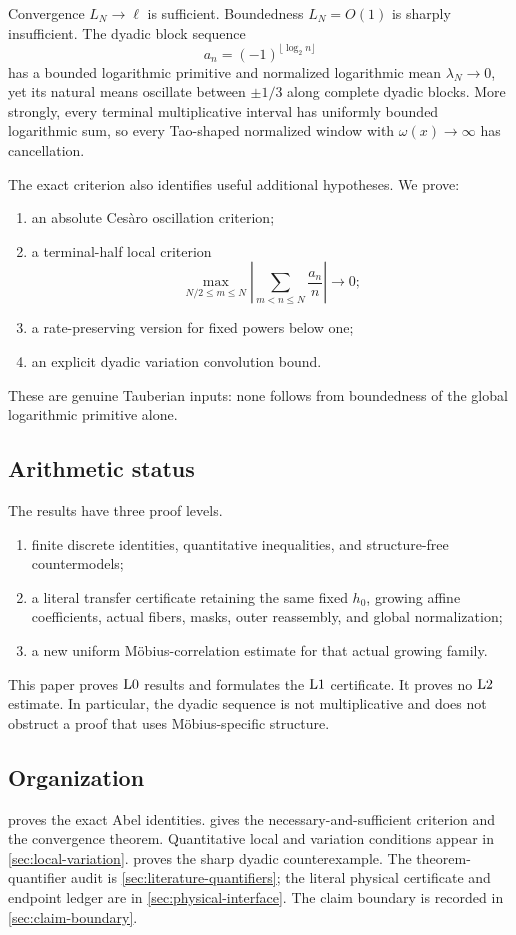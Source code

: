 Convergence \(L_N\to\ell\) is sufficient.  Boundedness \(L_N=O(1)\)
is sharply insufficient.  The dyadic block sequence
\[
 a_n=(-1)^{\lfloor\log_2n\rfloor}
\]
has a bounded logarithmic primitive and normalized logarithmic mean
\(\lambda_N\to0\), yet its natural means oscillate between
\(\pm1/3\) along complete dyadic blocks.  More strongly, every
terminal multiplicative interval has uniformly bounded logarithmic
sum, so every Tao-shaped normalized window with
\(\omega(x)\to\infty\) has cancellation.

The exact criterion also identifies useful additional hypotheses.
We prove:
\begin{enumerate}[label=\textup{(\roman*)},leftmargin=2.5em]
 \item an absolute Ces\`aro oscillation criterion;
 \item a terminal-half local criterion
 \[
  \max_{N/2\le m\le N}
  \left|\sum_{m<n\le N}\frac{a_n}{n}\right|\to0;
 \]
 \item a rate-preserving version for fixed powers below one;
 \item an explicit dyadic variation convolution bound.
\end{enumerate}
These are genuine Tauberian inputs: none follows from boundedness of
the global logarithmic primitive alone.

\subsection{Arithmetic status}

The results have three proof levels.
\begin{enumerate}[label=\textup{\(\mathrm{L}\arabic*\):},leftmargin=3.2em,start=0]
 \item finite discrete identities, quantitative inequalities, and
 structure-free countermodels;
 \item a literal transfer certificate retaining the same fixed
 \(h_0\), growing affine coefficients, actual fibers, masks, outer
 reassembly, and global normalization;
 \item a new uniform M\"obius-correlation estimate for that actual
 growing family.
\end{enumerate}
This paper proves \(\mathrm{L0}\) results and formulates the \(\mathrm{L1}\)
certificate.  It proves no \(\mathrm{L2}\) estimate.  In particular, the
dyadic sequence is not multiplicative and does not obstruct a proof
that uses M\"obius-specific structure.

\subsection{Organization}

 proves the exact Abel identities.
 gives the necessary-and-sufficient
criterion and the convergence theorem.  Quantitative local and
variation conditions appear in \cref{sec:local-variation}.
 proves the sharp dyadic
counterexample.  The theorem-quantifier audit is
\cref{sec:literature-quantifiers}; the literal physical certificate
and endpoint ledger are in \cref{sec:physical-interface}.  The claim
boundary is recorded in \cref{sec:claim-boundary}.
